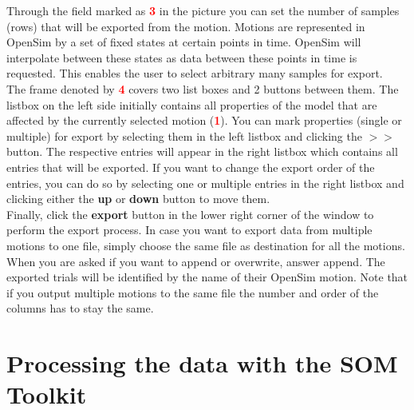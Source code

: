 \documentclass[a4paper]{scrartcl}
\newcommand{\imagenumber}[1]{\textcolor{red}{\textbf{#1}}}
\begin{document}
Through the field marked as \imagenumber{3} in the picture you can set the number of samples (rows) that will be exported from the motion.
Motions are represented in OpenSim by a set of fixed states at certain points in time. OpenSim will interpolate between these states as data between these points in time is requested. This enables the user to select arbitrary many samples for export.\\
The frame denoted by \imagenumber{4} covers two list boxes and 2 buttons between them.
The listbox on the left side initially contains all properties of the model that are affected by the currently selected motion (\imagenumber{1}). You can mark properties (single or multiple) for export by selecting them in the left listbox and clicking the $>>$ button. The respective entries will appear in the right listbox which contains all entries that will be exported. If you want to change the export order of the entries, you can do so by selecting one or multiple entries in the right listbox and clicking either the \textbf{up} or \textbf{down} button to move them.\\
Finally, click the \textbf{export} button in the lower right corner of the window to perform the export process.
In case you want to export data from multiple motions to one file, simply choose the same file as destination for all the motions. When you are asked if you want to append or overwrite, answer append. The exported trials will be identified by the name of their OpenSim motion. Note that if you output multiple motions to the same file the number and order of the columns has to stay the same.


\section{Processing the data with the SOM Toolkit}
\label{sec:som-toolkit}
\end{document}
